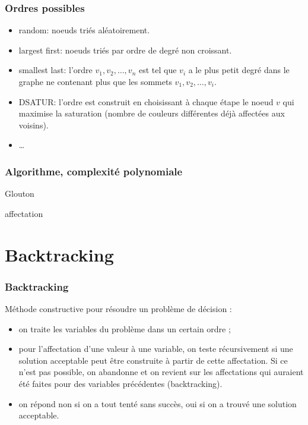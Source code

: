 \documentclass{beamer}
\begin{document}
\begin{frame}
  \frametitle{Ordres possibles}

  \begin{itemize}
  \item random: noeuds triés aléatoirement. 
  \item largest first: noeuds triés par ordre de degré non croissant.
  \item smallest last: l'ordre $v_1,v_2,\dots,v_n$ est tel
    que $v_i$ a le plus petit degré dans le graphe
    ne contenant plus que les sommets $v_1,v_2,\dots,v_i$.
  \item DSATUR: l'ordre est construit en choisissant à chaque étape
    le noeud $v$ qui maximise la saturation (nombre de couleurs différentes
    déjà affectées aux voisins).
  \item \dots
  \end{itemize}
  
\end{frame}

\begin{frame}
  \frametitle{Algorithme, complexité polynomiale}

 \begin{algorithm}[H]
  \caption{Glouton}
  \label{alg:glouton}
  \Return affectation
 \end{algorithm}
  
\end{frame}

\section{Backtracking}

\begin{frame}
  \frametitle{Backtracking}

  Méthode constructive pour résoudre un problème de décision :
  \begin{itemize}
  \item on traite les variables du problème dans un certain ordre ;
  \item pour l'affectation d'une valeur à une variable, on teste récursivement si une solution acceptable peut être construite à partir de cette affectation. Si ce n'est pas possible, on abandonne et on revient sur les affectations qui auraient été faites pour des variables précédentes (backtracking).
  \item on répond non si on a tout tenté sans succès, oui si on a trouvé une solution acceptable. 
  \end{itemize}
  
\end{frame}
\end{document}
